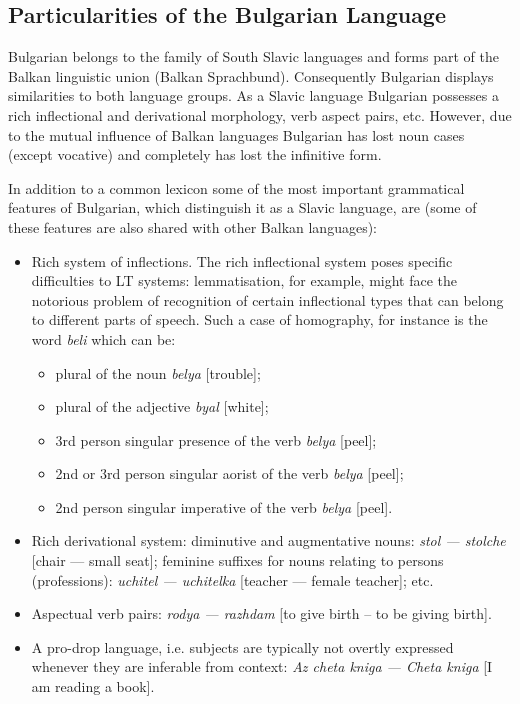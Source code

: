 \begin{multicols}{2}
\subsection{Particularities of the Bulgarian Language}

Bulgarian belongs to the family of South Slavic languages and forms part of the Balkan linguistic union (Balkan Sprachbund). Consequently Bulgarian displays similarities to both language groups. As a Slavic language Bulgarian possesses a rich inflectional and derivational morphology, verb aspect pairs, etc. However, due to the mutual influence of Balkan languages Bulgarian has lost noun cases (except vocative) and completely has lost the infinitive form.

In addition to a common lexicon some of the most important grammatical features of Bulgarian, which distinguish it as a Slavic language, are (some of these features are also shared with other Balkan languages):
\begin{itemize}
\item Rich system of inflections. The rich inflectional system poses specific difficulties to LT systems: lemmatisation, for example, might face the notorious problem of recognition of certain inflectional types that can belong to different parts of speech. Such a case of homography, for instance is the word \textit{{beli}} which can be: 
\begin{itemize}
\item plural of the noun \textit{{belya}} [trouble];
\item plural of the adjective \textit{{byal}} [white];
\item 3rd person singular presence of the verb \textit{{belya}} [peel];
\item 2nd or 3rd person singular aorist of the verb \textit{{belya}} [peel];
\item 2nd person singular imperative of the verb \textit{{belya}} [peel]. 
\end{itemize}

\item Rich derivational system: diminutive and augmentative nouns: \textit{{stol — stolche}} [chair — small seat]; feminine suffixes for nouns relating to persons (professions): \textit{{uchitel — uchitelka}} [teacher — female teacher]; etc.

\item Aspectual verb pairs: \textit{{rodya — razhdam}} [to give birth – to be giving birth].

\item A pro-drop language, i.e. subjects are typically not overtly expressed whenever they are inferable from context: \textit{{Az cheta kniga — Cheta kniga}} [I am reading a book]. 
\end{itemize}


\end{multicols}
